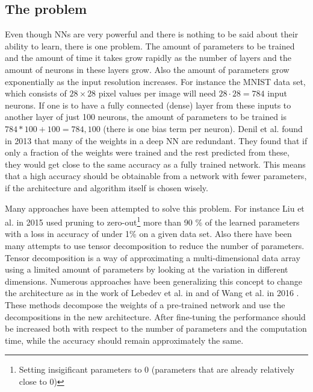 \subsection{The problem}
Even though NNs are very powerful and there is nothing to be said about their ability to learn, there is one problem. The amount of parameters to be trained and the amount of time it takes grow rapidly as the number of layers and the amount of neurons in these layers grow. Also the amount of parameters grow exponentially as the input resolution increases. For instance the MNIST data set, which consists of $28\times28$ pixel values per image will need $28\cdot28 = 784$ input neurons. If one is to have a fully connected (dense) layer from these inputs to another layer of just 100 neurons, the amount of parameters to be trained is $784 * 100 + 100 = 784,100$ (there is one bias term per neuron). Denil et al. found in 2013 that many of the weights in a deep NN are redundant\cite{Denil2013}. They found that if only a fraction of the weights were trained and the rest predicted from these, they would get close to the same accuracy as a fully trained network. This means that a high accuracy should be obtainable from a network with fewer parameters, if the architecture and algorithm itself is chosen wisely.

Many approaches have been attempted to solve this problem. For instance Liu et al. in 2015 used pruning to zero-out\footnote{Setting insigificant parameters to 0 (parameters that are already relatively close to 0)} more than 90 \% of the learned parameters with a loss in accuracy of under 1\% on a given data set. Also there have been many attempts to use tensor decomposition to reduce the number of parameters. Tensor decomposition is a way of approximating a multi-dimensional data array using a limited amount of parameters by looking at the variation in different dimensions. Numerous approaches have been generalizing this concept to change the architecture as in the work of Lebedev et al. in \cite{Lebedev2015} and of Wang et al. in 2016 \cite{Wang2016}. These methods decompose the weights of a pre-trained network and use the decompositions in the new architecture. After fine-tuning the performance should be increased both with respect to the number of parameters and the computation time, while the accuracy should remain approximately the same.

